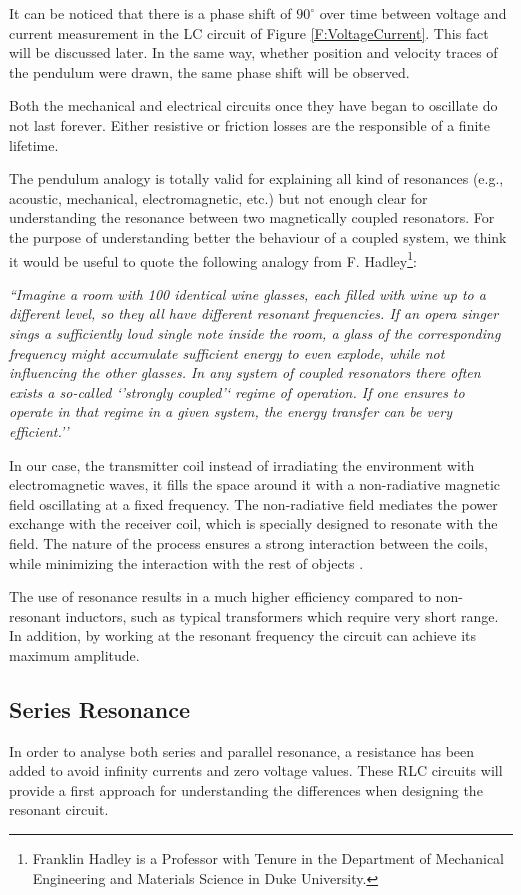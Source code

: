 It can be noticed that there is a phase shift of $90^\circ$ over time between voltage and current measurement in the LC circuit of Figure \ref{F:VoltageCurrent}. This fact will be discussed later. In the same way, whether position and velocity traces of the pendulum were drawn, the same phase shift will be observed.

Both the mechanical and electrical circuits once they have began to oscillate do not last forever. Either resistive or friction losses are the responsible of a finite lifetime.

The pendulum analogy is totally valid for explaining all kind of resonances (e.g., acoustic, mechanical, electromagnetic, etc.) but not enough clear for understanding the resonance between two magnetically coupled resonators. For the purpose of understanding better the behaviour of a coupled system, we think it would be useful to quote the following analogy from F. Hadley\footnote{Franklin Hadley is a Professor with Tenure in the Department of Mechanical Engineering and Materials Science in Duke University.}:

\textit{``Imagine a room with 100 identical wine glasses, each filled with wine up to a different level, so they all have different resonant frequencies. If an opera singer sings a sufficiently loud single note inside the room, a glass of the corresponding frequency might accumulate sufficient energy to even explode, while not influencing the other glasses. In any system of coupled resonators there often exists a so-called `'strongly coupled'` regime of operation. If one ensures to operate in that regime in a given system, the energy transfer can be very efficient.''} 

In our case, the transmitter coil instead of irradiating the environment with electromagnetic waves, it fills the space around it with a non-radiative magnetic field oscillating at a fixed frequency. The non-radiative field mediates the power exchange with the receiver coil, which is specially designed to resonate with the field. The nature of the process ensures a strong interaction between the coils, while minimizing the interaction with the rest of objects \cite{TechTalk}.

The use of resonance results in a much higher efficiency compared to non-resonant inductors, such as typical transformers which require very short range. In addition, by working at the resonant frequency the circuit can achieve its maximum amplitude.

		\subsection{Series Resonance}\label{subsec:seriesResonance}
In order to analyse both series and parallel resonance, a resistance has been added to avoid infinity currents and zero voltage values. These RLC circuits will provide a first approach for understanding the differences when designing the resonant circuit. 


